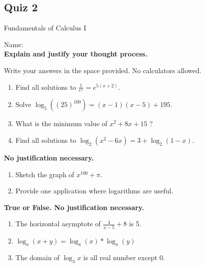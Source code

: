\documentclass[a4paper, 12pt]{article}
\title{}
\date{}
\newcommand{\bt}[1]{\textbf{#1}} %
\begin{document}
\begin{center}
\section*{Quiz 2}
Fundamentals of Calculus I
\end{center}

Name: \underline{\hspace{5cm}} \\

\bt{Explain and justify your thought process.}

Write your answers in the space provided. No calculators allowed.

\begin{enumerate}
    \item Find all solutions to $\frac{1}{e^x} = e^{5(x+2)}$.
    \vspace{6cm}
    \item Solve $\log_5 ((25)^{100}) = (x-1)(x-5) + 195$.
    \vspace{6cm}
    \item What is the minimum value of $x^2 + 8x + 15$ ?
    \vspace{6cm}
    \item Find all solutions to $\log_2 (x^2 - 6x) = 3 + \log_2 (1-x)$.
    \vspace{6cm}
\end{enumerate}


\bt{No justification necessary.}
\begin{enumerate}[resume]
    \item Sketch the graph of $x^{100} + \pi$.
    \vspace{5cm}
    \item Provide one application where logarithms are useful.
    \vspace{5cm}
\end{enumerate}

\bt{True or False. No justification necessary.}
\begin{enumerate}[resume]
    \item \underline{\hspace{1.5cm}} The horizontal asymptote of $\frac{4}{x-5} + 8$ is 5.
    \item \underline{\hspace{1.5cm}} $\log_a (x + y) = \log_a (x) * \log_a (y)$
    \item \underline{\hspace{1.5cm}} The domain of $\log_3 x$  is all real number except 0. \\
\end{enumerate}
\end{document}
